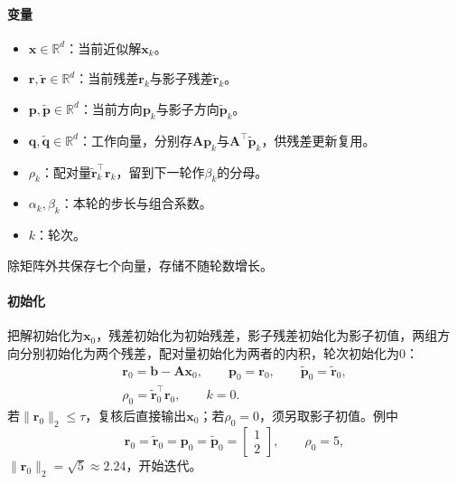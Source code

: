 \paragraph{变量}
\begin{itemize}
 \item $\bm x\in\mathbb R^d$：当前近似解$\bm x_k$。
 \item $\bm r,\widetilde{\bm r}\in\mathbb R^d$：当前残差$\bm r_k$与影子残差$\widetilde{\bm r}_k$。
 \item $\bm p,\widetilde{\bm p}\in\mathbb R^d$：当前方向$\bm p_k$与影子方向$\widetilde{\bm p}_k$。
 \item $\bm q,\widetilde{\bm q}\in\mathbb R^d$：工作向量，分别存$\bm A\bm p_k$与$\bm A^\top\widetilde{\bm p}_k$，供残差更新复用。
 \item $\rho_k$：配对量$\widetilde{\bm r}_k^\top\bm r_k$，留到下一轮作$\beta_k$的分母。
 \item $\alpha_k,\beta_k$：本轮的步长与组合系数。
 \item $k$：轮次。
\end{itemize}
除矩阵外共保存七个向量，存储不随轮数增长。

\paragraph{初始化}
把解初始化为$\bm x_0$，残差初始化为初始残差，影子残差初始化为影子初值，两组方向分别初始化为两个残差，配对量初始化为两者的内积，轮次初始化为$0$：
\[
 \begin{gathered}
 \bm r_0=\bm b-\bm A\bm x_0,\qquad \bm p_0=\bm r_0,\qquad \widetilde{\bm p}_0=\widetilde{\bm r}_0,\\
 \rho_0=\widetilde{\bm r}_0^\top\bm r_0,\qquad k=0 .
 \end{gathered}
\]
若$\lVert\bm r_0\rVert_2\le\tau$，复核后直接输出$\bm x_0$；若$\rho_0=0$，须另取影子初值。例中
\[
 \bm r_0=\widetilde{\bm r}_0=\bm p_0=\widetilde{\bm p}_0=\begin{bmatrix}1\\2\end{bmatrix},\qquad \rho_0=5,
\]
$\lVert\bm r_0\rVert_2=\sqrt5\approx2.24$，开始迭代。

